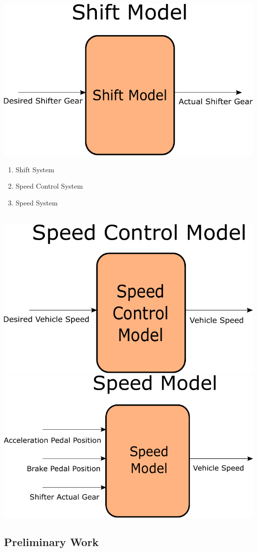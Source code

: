 \documentclass{beamer}
\begin{document}
\begin{frame}
\centering
\includegraphics[width=.45\linewidth]{figs/inkscape/shiftModelArchitecture}\quad%
\begin{minipage}[b][0.4\textheight][c]{.45\linewidth} \begin{enumerate} \item Shift System \item Speed Control System \item Speed System \end{enumerate} \end{minipage}\\[1em]
\includegraphics[width=.45\linewidth]{figs/inkscape/speedControlModelArchitecture}\quad%
\includegraphics[width=.45\linewidth]{figs/inkscape/speedModelArchitecture}
\end{frame}


\subsection{Preliminary Work}
\end{document}

